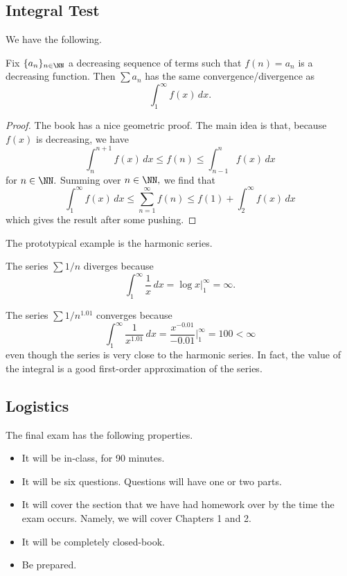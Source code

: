 \subsection{Integral Test}
We have the following.
\begin{prop}
	Fix $\{a_n\}_{n\in\NN}$ a decreasing sequence of terms such that $f(n)=a_n$ is a decreasing function. Then $\sum a_n$ has the same convergence/divergence as
	\[\int_1^\infty f(x)\,dx.\]
\end{prop}
\begin{proof}
	The book has a nice geometric proof. The main idea is that, because $f(x)$ is decreasing, we have
	\[\int_n^{n+1}f(x)\,dx\le f(n)\le\int_{n-1}^nf(x)\,dx\]
	for $n\in\NN.$ Summing over $n\in\NN,$ we find that
	\[\int_1^\infty f(x)\,dx\le\sum_{n=1}^\infty f(n)\le f(1)+\int_2^\infty f(x)\,dx\]
	which gives the result after some pushing.
\end{proof}
The prototypical example is the harmonic series.
\begin{example}
	The series $\sum1/n$ diverges because
	\[\int_1^\infty\frac1x\,dx=\log x\bigg|_1^\infty=\infty.\]
\end{example}
\begin{example}
	The series $\sum1/n^{1.01}$ converges because
	\[\int_1^{\infty}\frac1{x^{1.01}}\,dx=\frac{x^{-0.01}}{-0.01}\bigg|_1^\infty=100<\infty\]
	even though the series is very close to the harmonic series. In fact, the value of the integral is a good first-order approximation of the series.
\end{example}

\subsection{Logistics}
The final exam has the following properties.
\begin{itemize}
	\item It will be in-class, for 90 minutes.
	\item It will be six questions. Questions will have one or two parts.
	\item It will cover the section that we have had homework over by the time the exam occurs. Namely, we will cover Chapters 1 and 2.
	\item It will be completely closed-book.
	\item Be prepared.
\end{itemize}